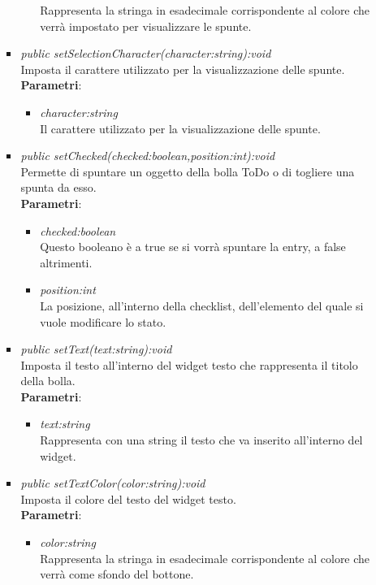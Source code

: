 \begin{itemize}
\begin{itemize}
\begin{itemize}
\begin{itemize}
		Rappresenta la stringa in esadecimale corrispondente al colore che verrà impostato per visualizzare le spunte.
		\end{itemize}  
\item \textit{public setSelectionCharacter(character:string):void}\\
	Imposta il carattere utilizzato per la visualizzazione delle spunte.
		\\ \textbf{Parametri}: \begin{itemize}
		\item \textit{character:string}\\
		Il carattere utilizzato per la visualizzazione delle spunte.
		\end{itemize} 
\item \textit{public setChecked(checked:boolean,position:int):void}\\
	Permette di spuntare un oggetto della bolla ToDo o di togliere una spunta da esso.
		\\ \textbf{Parametri}: \begin{itemize}
		\item \textit{checked:boolean}\\
		Questo booleano è a true se si vorrà spuntare la entry, a false altrimenti.
		\item \textit{position:int}\\
		La posizione, all'interno della checklist, dell'elemento del quale si vuole modificare lo stato. 
		\end{itemize}
\item \textit{public setText(text:string):void}\\
	Imposta il testo all'interno del widget testo che rappresenta il titolo della bolla.
		\\ \textbf{Parametri}: \begin{itemize}
		\item \textit{text:string}\\
		Rappresenta con una string il testo che va inserito all'interno del widget.
		\end{itemize}
\item \textit{public setTextColor(color:string):void}\\
	Imposta il colore del testo del widget testo.
		\\ \textbf{Parametri}: \begin{itemize}
		\item \textit{color:string}\\
		Rappresenta la stringa in esadecimale corrispondente al colore che verrà come sfondo del bottone.

\end{itemize}
\end{itemize}
\end{itemize}
\end{itemize}

